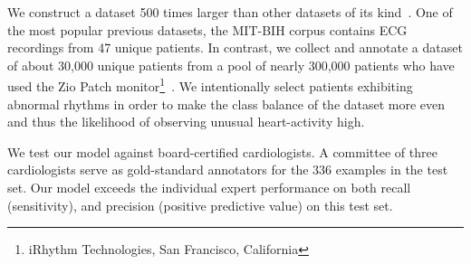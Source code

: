 We construct a dataset 500 times larger than other datasets of its
kind~\cite{moody2001impact, goldberger2000physiobank}. One of the most popular
previous datasets, the MIT-BIH corpus contains ECG recordings from 47 unique
patients. In contrast, we collect and annotate a dataset of about 30,000 unique
patients from a pool of nearly 300,000 patients who have used the Zio Patch
monitor\footnote[1]{iRhythm Technologies, San Francisco,
California}~\cite{turakhia2013diagnostic}. We intentionally select patients
exhibiting abnormal rhythms in order to make the class balance of the dataset
more even and thus the likelihood of observing unusual heart-activity high.

We test our model against board-certified cardiologists. A committee of three
cardiologists serve as gold-standard annotators for the 336 examples in the
test set. Our model exceeds the individual expert performance on both recall
(sensitivity), and precision (positive predictive value) on this test set.
